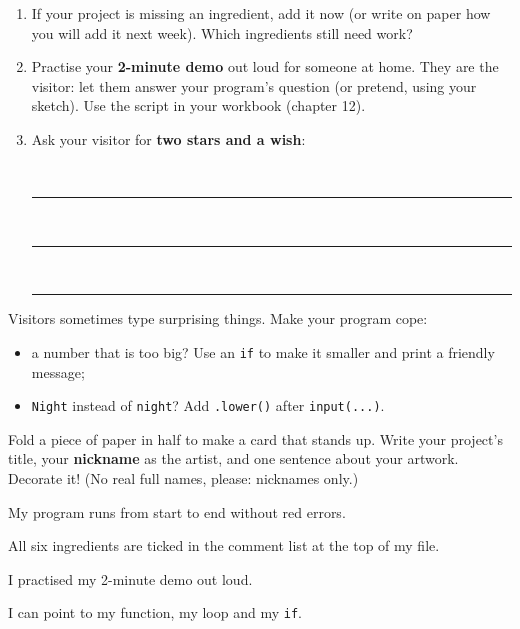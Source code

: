 \namedateline

\begin{core}
\begin{enumerate}[leftmargin=1.4em,itemsep=2pt]
  \item If your project is missing an ingredient, add it now (or write on paper how you will add it next week). Which ingredients still need work?
  \item Practise your \textbf{2-minute demo} out loud for someone at home. They are the visitor: let them answer your program's question (or pretend, using your sketch). Use the script in your workbook (chapter 12).
  \item Ask your visitor for \textbf{two stars and a wish}:\par
  \faStar\ \rule{11cm}{0.4pt}\par\smallskip
  \faStar\ \rule{11cm}{0.4pt}\par\smallskip
  \faMagic\ \rule{11cm}{0.4pt}
\end{enumerate}
\end{core}

\begin{challenge}
Visitors sometimes type surprising things. Make your program cope:
\begin{itemize}[leftmargin=1.2em,itemsep=1pt]
  \item a number that is too big? Use an \texttt{if} to make it smaller and print a friendly message;
  \item \texttt{Night} instead of \texttt{night}? Add \texttt{.lower()} after \texttt{input(...)}.
\end{itemize}
\end{challenge}

\begin{creative}
Fold a piece of paper in half to make a card that stands up. Write your project's title, your \textbf{nickname} as the artist, and one sentence about your artwork. Decorate it! (No real full names, please: nicknames only.)
\end{creative}

\begin{selfcheck}
  \item My program runs from start to end without red errors.
  \item All six ingredients are ticked in the comment list at the top of my file.
  \item I practised my 2-minute demo out loud.
  \item I can point to my function, my loop and my \texttt{if}.
\end{selfcheck}
